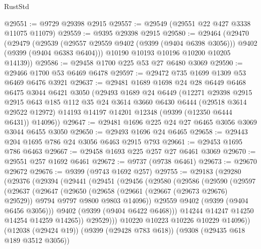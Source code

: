 \begin{lexlean}{RustStd}
\begin{coremodule}
@29551 := @9729 @29398 @2915
@29557 := @29549 (@29551 @22 @427 @3338 @11075 @11079)
@29559 := @9395 @29398 @2915
@29580 := @29464
    (@29470
      (@29479
        (@29539 (@29557 @29559 @9402 (@9399 (@9404 @6398 @3056))) @9402 (@9399 (@9404 @6383 @6404)))
        @10190
        @10193
        @10196
        @10200
        @10205
        @14139))
@29586 := @29458 @1700 @225 @53 @27 @6480 @3069
@29590 := @29466 @1700 @53 @6469 @6478
@29597 := @29472 @735 @1699 @1309 @53 @6469 @6476 @3921
@29637 := @29481
    @1689
    @1698
    @24
    @28
    @6449
    @6468
    @6475
    @3044
    @6421
    @3050
    (@29493
      @1689
      @24
      @6449
      (@12271
        @29398
        @2915
        @2915
        @643
        @185
        @112
        @35
        @24
        @3614
        @3660
        @6430
        @6444
        (@29518 @3614 @29522 @12972)
        @14193
        @14197
        @14201
        @12348
        (@9399 (@12350 @6444 @6431))
        @14096))
@29647 := @29481 @1696 @225 @24 @27 @6465 @3056 @3069 @3044 @6455 @3050
@29650 := @29493 @1696 @24 @6465
@29658 := @29443 @204 @1695 @786 @24 @3056 @6463 @2915 @793
@29661 := @29453 @1695 @786 @6463
@29667 := @29458 @1693 @225 @257 @27 @6461 @3069
@29670 := @29551 @257 @1692 @6461
@29672 := @9737 (@9738 @6461)
@29673 := @29670 @29672
@29676 := @9399 (@9743 @1692 @257)
@29755 := @29183
    (@29280
      (@29376
        (@29394
          (@29441
            (@29451
              (@29456
                (@29580
                  (@29586
                    (@29590
                      (@29597
                        (@29637
                          (@29647
                            (@29650
                              (@29658
                                (@29661 (@29667 (@29673 @29676) @29529))
                                @9794
                                @9797
                                @9800
                                @9803
                                @14096))
                            @29559
                            @9402
                            (@9399 (@9404 @6456 @3056)))
                          @9402
                          (@9399 (@9404 @6422 @6468)))
                        @14244
                        @14247
                        @14250
                        @14254
                        @14259
                        @14265))
                    @29529)))
              @10220
              @10223
              @10226
              @10229
              @14096))
          (@12038 (@29424 @19))
          (@9399 (@29428 @783 @618))
          (@9308 (@29435 @618 @189 @3512 @3056))

\end{coremodule}
\end{lexlean}

